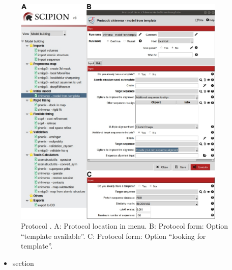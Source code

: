 \begin{itemize}
            \begin{figure}[H]
                \centering 
                \captionsetup{width=.9\linewidth} 
                \includegraphics[width=0.90\textwidth]{Images_appendix/Fig111.pdf}
                \caption{Protocol . A: Protocol location in \scipion menu. B: Protocol form: Option ``template available''. C: Protocol form: Option ``looking for template''.}
                \label{fig:app_protocol_seqHomology_1}
            \end{figure}
            
            \begin{itemize}
                    \item {} section
  


\end{itemize}
\end{itemize}
